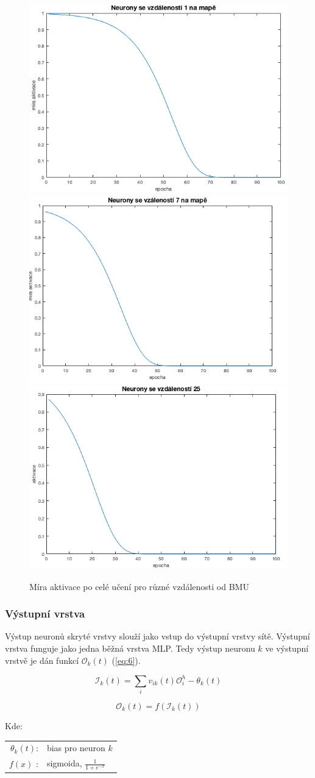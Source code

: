 \documentclass[thesis=M,czech]{FITthesis}[2012/06/26]
\begin{document}
\begin{figure}[htp]

\centering

\includegraphics[width=.32\textwidth]{sigma_1.png}
\includegraphics[width=.32\textwidth]{sigma_7.png}
\includegraphics[width=.32\textwidth]{sigma_25.png}
\caption{Míra aktivace po celé učení pro různé vzdálenosti od BMU}
\label{fig:sigma}

\end{figure}


\subsubsection*{Výstupní vrstva}
Výstup neuronů skryté vrstvy slouží jako vstup do výstupní vrstvy sítě. Výstupní vrstva funguje jako jedna běžná vrstva MLP. Tedy výstup neuronu  $k$ ve výstupní vrstvě je dán funkcí $\mathcal{O}_k(t)$ (\ref{eq:6}).

\vspace{\baselineskip}
\noindent
\begin{minipage}[c]{\textwidth }

\begin{equation*}
   \mathcal{I}_k(t) = \sum\limits_i{v_{ik}(t)\mathcal{O}_i^h - \theta_k(t)}  
\end{equation*}

\begin{equation} \label{eq:6}
   \mathcal{O}_k(t) = f(\mathcal{I}_k(t))
\end{equation}


Kde:\\
\hspace*{3em}
\begin{tabular}{rl}
    $\theta_k(t)$:& bias pro neuron $k$ \\
    $f(x) $ :& sigmoida, $\frac{1}{1+e^{-x}}$ \\

\end{tabular}
\end{minipage} 
\vspace{\baselineskip}
\noindent
\end{document}
